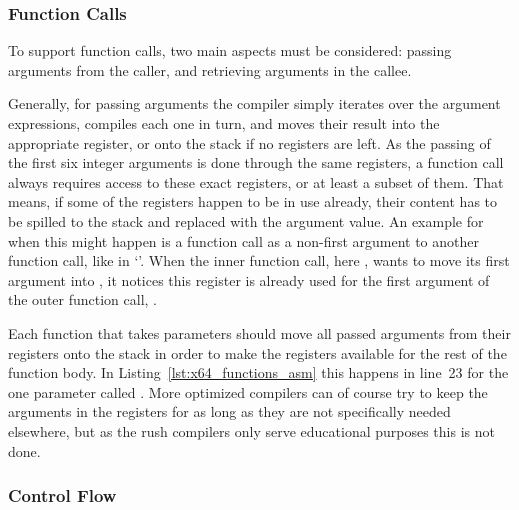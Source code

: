 
\subsubsection{Function Calls}


To support function calls, two main aspects must be considered: passing arguments from the caller, and retrieving arguments in the callee.

Generally, for passing arguments the compiler simply iterates over the argument expressions, compiles each one in turn, and moves their result into the appropriate register, or onto the stack if no registers are left.
As the passing of the first six integer arguments is done through the same registers, a function call always requires access to these exact registers, or at least a subset of them.
That means, if some of the registers happen to be in use already, their content has to be spilled to the stack and replaced with the argument value.
An example for when this might happen is a function call as a non-first argument to another function call, like in `'.
When the inner function call, here , wants to move its first argument  into , it notices this register is already used for the first argument of the outer function call, .

Each function that takes parameters should move all passed arguments from their registers onto the stack in order to make the registers available for the rest of the function body.
In Listing~\ref{lst:x64_functions_asm} this happens in line~23 for the one parameter called .
More optimized compilers can of course try to keep the arguments in the registers for as long as they are not specifically needed elsewhere, but as the rush compilers only serve educational purposes this is not done.

\subsubsection{}

\subsubsection{Control Flow}

